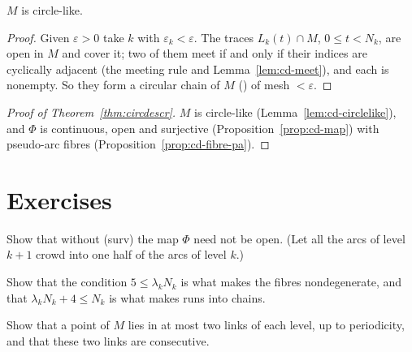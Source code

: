 
\begin{lemma}\label{lem:cd-circlelike}
$M$ is circle-like.
\end{lemma}

\begin{proof}
Given $\varepsilon>0$ take $k$ with $\varepsilon_k<\varepsilon$. The traces $L_k(t)\cap M$, $0\le t<N_k$, are open in $M$ and cover it; two of them meet if and only if their indices are cyclically
adjacent (the meeting rule and Lemma~\ref{lem:cd-meet}), and each is nonempty. So they form a circular chain of $M$ () of mesh $<\varepsilon$.
\end{proof}


\begin{proof}[Proof of Theorem~\ref{thm:circdescr}]
$M$ is circle-like (Lemma~\ref{lem:cd-circlelike}), and $\Phi$ is continuous, open and surjective (Proposition~\ref{prop:cd-map}) with pseudo-arc fibres
(Proposition~\ref{prop:cd-fibre-pa}).
\end{proof}

\section*{Exercises}

\begin{exercise}
Show that without (surv) the map $\Phi$ need not be open. (Let all the arcs of level $k+1$ crowd into one half of the arcs of level $k$.)
\end{exercise}

\begin{exercise}
Show that the condition $5\le\lambda_kN_k$ is what makes the fibres nondegenerate, and that $\lambda_kN_k+4\le N_k$ is what makes runs into chains.
\end{exercise}

\begin{exercise}
Show that a point of $M$ lies in at most two links of each level, up to periodicity, and that these two links are consecutive.
\end{exercise}
